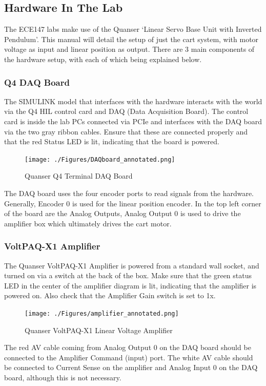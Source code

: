 \documentclass[11pt,letterpaper]{article}
\begin{document}
\subsection*{Hardware In The Lab}
The ECE147 labs make use of the Quanser `Linear Servo Base Unit with Inverted Pendulum'. This manual will detail the setup of just the cart system, with motor voltage as input and linear position as output. There are 3 main components of the hardware setup, with each of which being explained below.

\subsubsection*{Q4 DAQ Board}
The SIMULINK model that interfaces with the hardware interacts with the world via the Q4 HIL control card and DAQ (Data Acquisition Board). The control card is inside the lab PCs connected via PCIe and interfaces with the DAQ board via the two gray ribbon cables. Ensure that these are connected properly and that the red Status LED is lit, indicating that the board is powered.
\begin{figure}[H]
  \centering
  \texttt{[image: ./Figures/DAQboard\_annotated.png]}
  \caption{Quanser Q4 Terminal DAQ Board}
\end{figure}
The DAQ board uses the four encoder ports to read signals from the hardware. Generally, Encoder 0 is used for the linear position encoder. In the top left corner of the board are the Analog Outputs, Analog Output 0 is used to drive the amplifier box which ultimately drives the cart motor.



\subsubsection*{VoltPAQ-X1 Amplifier}
The Quanser VoltPAQ-X1 Amplifier is powered from a standard wall socket, and turned on via a switch at the back of the box. Make sure that the green status LED in the center of the amplifier diagram is lit, indicating that the amplifier is powered on. Also check that the Amplifier Gain switch is set to 1x.


\begin{figure}[H]
  \centering
  \texttt{[image: ./Figures/amplifier\_annotated.png]}
  \caption{Quanser VoltPAQ-X1 Linear Voltage Amplifier}
\end{figure}

The red AV cable coming from Analog Output 0 on the DAQ board should be connected to the Amplifier Command (input) port. The white AV cable should be connected to Current Sense on the amplifier and Analog Input 0 on the DAQ board, although this is not necessary. \\
\end{document}

